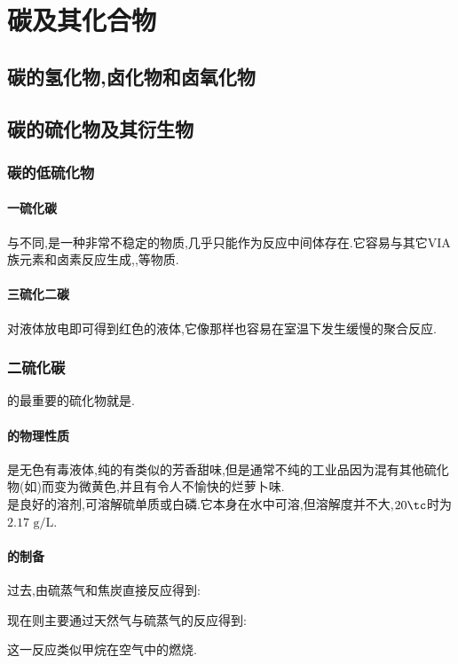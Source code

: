 \documentclass[draft]{ctexart}
\begin{document}
\section{碳及其化合物}
\subsection{碳的氢化物,卤化物和卤氧化物}
\subsection{碳的硫化物及其衍生物}
\subsubsection{碳的低硫化物}
\paragraph{一硫化碳}
与不同,是一种非常不稳定的物质,几乎只能作为反应中间体存在.它容易与其它VIA族元素和卤素反应生成,,等物质.
\paragraph{三硫化二碳}
对液体放电即可得到红色的液体,它像那样也容易在室温下发生缓慢的聚合反应.
\subsubsection{二硫化碳}
的最重要的硫化物就是.
\paragraph{的物理性质}
是无色有毒液体,纯的有类似的芳香甜味,但是通常不纯的工业品因为混有其他硫化物(如)而变为微黄色,并且有令人不愉快的烂萝卜味.\\
\indent {}是良好的溶剂,可溶解硫单质或白磷.它本身在水中可溶,但溶解度并不大,$20\tc$时为$2.17\text{ g/L}$.
\paragraph{的制备}
过去,由硫蒸气和焦炭直接反应得到:
\begin{center}
\end{center}
现在则主要通过天然气与硫蒸气的反应得到:
\begin{center}
\end{center}
这一反应类似甲烷在空气中的燃烧.
\end{document}
